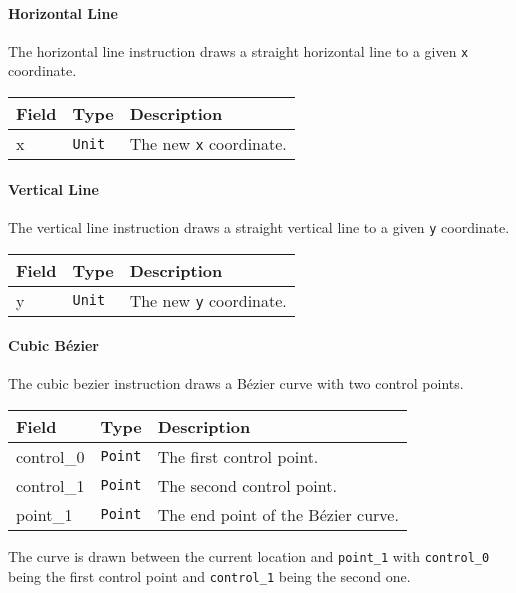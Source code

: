 \documentclass[]{article}
\begin{document}
\hypertarget{horizontal-line}{%
\paragraph{Horizontal Line}\label{horizontal-line}}

The horizontal line instruction draws a straight horizontal line to a
given \texttt{x} coordinate.

\begin{longtable}[]{@{}p{1in}p{2in}p{3in}@{}}
\toprule
Field & Type & Description \\
\midrule
\endhead
x & \texttt{Unit} & The new \texttt{x} coordinate. \\
\bottomrule
\end{longtable}

\hypertarget{vertical-line}{%
\paragraph{Vertical Line}\label{vertical-line}}

The vertical line instruction draws a straight vertical line to a given
\texttt{y} coordinate.

\begin{longtable}[]{@{}p{1in}p{2in}p{3in}@{}}
\toprule
Field & Type & Description \\
\midrule
\endhead
y & \texttt{Unit} & The new \texttt{y} coordinate. \\
\bottomrule
\end{longtable}

\hypertarget{cubic-bezier}{%
\paragraph{Cubic Bézier}\label{cubic-bezier}}

The cubic bezier instruction draws a Bézier curve with two control
points.

\begin{longtable}[]{@{}p{1in}p{2in}p{3in}@{}}
\toprule
Field & Type & Description \\
\midrule
\endhead
control\_0 & \texttt{Point} & The first control point. \\
control\_1 & \texttt{Point} & The second control point. \\
point\_1 & \texttt{Point} & The end point of the Bézier curve. \\
\bottomrule
\end{longtable}

The curve is drawn between the current location and \texttt{point\_1}
with \texttt{control\_0} being the first control point and
\texttt{control\_1} being the second one.
\end{document}

